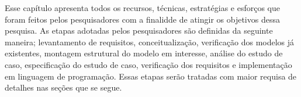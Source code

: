 Esse capítulo apresenta todos os recursos, técnicas, estratégias e esforços que foram feitos pelos pesquisadores com a finalidde de atingir os objetivos dessa pesquisa. As etapas adotadas pelos pesquisadores são definidas da seguinte maneira; levantamento de requisitos, conceitualização, verificação dos modelos já existentes, montagem estrutural do modelo em interesse, análise do estudo de caso, especificação do estudo de caso, verificação dos requisitos e implementação em linguagem de programação. Essas etapas serão tratadas com maior requisa de detalhes nas seções que se segue. 
